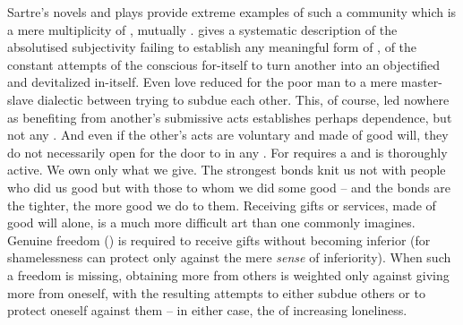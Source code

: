 Sartre's novels and plays provide extreme examples of such a community which is
a mere multiplicity of , mutually .   gives a systematic description of the absolutised
subjectivity failing to establish any meaningful form of , of the
constant attempts of the conscious for-itself to turn another into an
objectified and devitalized in-itself. Even love reduced for the poor man to a
mere master-slave dialectic between  trying to
subdue each other.  This, of course, led nowhere as benefiting from another's
submissive acts establishes perhaps dependence, but not any . And
even if the other's acts are voluntary and made of good will, they do not
necessarily open for  the door to  in any
. For  requires a  and is
thoroughly active. We own only what we give.\label{own-give} The strongest bonds
knit us not 
with people who did us good but with those to whom we did some good -- and the
bonds are the tighter, the more good we do to them.  Receiving gifts or
services, made of good will alone, is a much more difficult art than one
commonly imagines. Genuine freedom () is required to
receive gifts without becoming inferior (for shamelessness can protect only
against the mere {\em sense} of inferiority). When such a freedom is missing, obtaining more from others is
weighted only against giving more from oneself, with the resulting attempts to
either subdue others or to protect oneself against them -- in either case, the
 of increasing loneliness.

